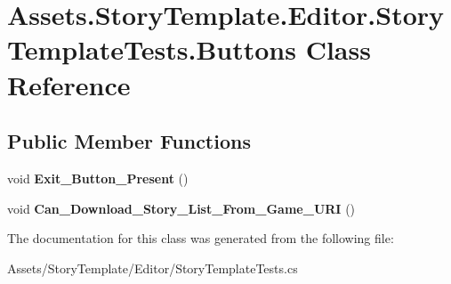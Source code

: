\hypertarget{classAssets_1_1StoryTemplate_1_1Editor_1_1StoryTemplateTests_1_1Buttons}{}\section{Assets.\+Story\+Template.\+Editor.\+Story\+Template\+Tests.\+Buttons Class Reference}
\label{classAssets_1_1StoryTemplate_1_1Editor_1_1StoryTemplateTests_1_1Buttons}
\subsection*{Public Member Functions}
\begin{DoxyCompactItemize}
\item 
void {\bfseries Exit\+\_\+\+Button\+\_\+\+Present} ()\hypertarget{classAssets_1_1StoryTemplate_1_1Editor_1_1StoryTemplateTests_1_1Buttons_aa39e9f432f96e5c9ab433d6b659b7ec2}{}\label{classAssets_1_1StoryTemplate_1_1Editor_1_1StoryTemplateTests_1_1Buttons_aa39e9f432f96e5c9ab433d6b659b7ec2}

\item 
void {\bfseries Can\+\_\+\+Download\+\_\+\+Story\+\_\+\+List\+\_\+\+From\+\_\+\+Game\+\_\+\+U\+RI} ()\hypertarget{classAssets_1_1StoryTemplate_1_1Editor_1_1StoryTemplateTests_1_1Buttons_a850c19aaa6903469449c8aa4fef6265d}{}\label{classAssets_1_1StoryTemplate_1_1Editor_1_1StoryTemplateTests_1_1Buttons_a850c19aaa6903469449c8aa4fef6265d}

\end{DoxyCompactItemize}


The documentation for this class was generated from the following file\+:\begin{DoxyCompactItemize}
\item 
Assets/\+Story\+Template/\+Editor/Story\+Template\+Tests.\+cs\end{DoxyCompactItemize}
